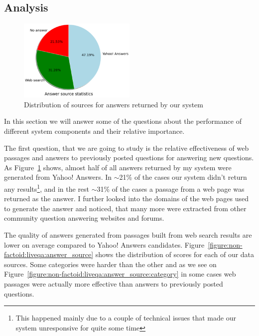 \subsection{Analysis}
\label{section:non-factoid:liveqa:analysis}

\begin{figure}
	\centering
	\includegraphics[width=0.5\textwidth]{img/liveqa_answer_source}
	\caption{Distribution of sources for answers returned by our system}
	\label{figure:non-factoid:liveqa:answer_source_pie}
\end{figure}

In this section we will answer some of the questions about the performance of different system components and their relative importance.

The first question, that we are going to study is the relative effectiveness of web passages and answers to previously posted questions for answering new questions.
As Figure~\ref{figure:non-factoid:liveqa:answer_source_pie} shows, almost half of all answers returned by my system were generated from Yahoo! Answers.
In $\sim$21\% of the cases our system didn't return any results\footnote{This happened mainly due to a couple of technical issues that made our system unresponsive for quite some time}, and in the rest $\sim$31\% of the cases a passage from a web page was returned as the answer.
I further looked into the domains of the web pages used to generate the answer and noticed, that many more were extracted from other community question answering websites and forums.

The quality of answers generated from passages built from web search results are lower on average compared to Yahoo! Answers candidates.
Figure~\ref{figure:non-factoid:liveqa:answer_source} shows the distribution of scores for each of our data sources.
Some categories were harder than the other \cite{overviewliveqa15} and as we see on Figure~\ref{figure:non-factoid:liveqa:answer_source:category} in some cases web passages were actually more effective than answers to previously posted questions.

